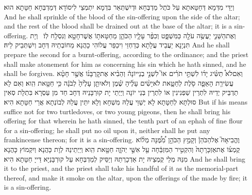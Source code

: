 {וְיַדֵּי מִדְּמָא דְּחַטָּאתָא עַל כֹּתֶל מַדְבְּחָא וּדְיִשְׁתְּאַר בִּדְמָא יִתְמְצֵי לִיסוֹדָא דְּמַדְבְּחָא חַטָּתָא הוּא׃}
{And he shall sprinkle of the blood of the sin-offering upon the side of the altar; and the rest of the blood shall be drained out at the base of the altar; it is a sin-offering.}{}
{וְאֶת\maqqaf הַשֵּׁנִ֛י יַעֲשֶׂ֥ה עֹלָ֖ה כַּמִּשְׁפָּ֑ט וְכִפֶּ֨ר עָלָ֧יו הַכֹּהֵ֛ן מֵחַטָּאת֥וֹ אֲשֶׁר\maqqaf חָטָ֖א וְנִסְלַ֥ח לֽוֹ׃ \setuma }
{וְיָת תִּנְיָנָא יַעֲבֵיד עֲלָתָא כְּדַחְזֵי וִיכַפַּר עֲלוֹהִי כָהֲנָא מֵחוֹבְתֵיהּ דְּחָב וְיִשְׁתְּבֵיק לֵיהּ׃}
{And he shall prepare the second for a burnt-offering, according to the ordinance; and the priest shall make atonement for him as concerning his sin which he hath sinned, and he shall be forgiven.}{}
{וְאִם\maqqaf לֹא֩ תַשִּׂ֨יג יָד֜וֹ לִשְׁתֵּ֣י תֹרִ֗ים אוֹ֮ לִשְׁנֵ֣י בְנֵי\maqqaf יוֹנָה֒ וְהֵבִ֨יא אֶת\maqqaf קׇרְבָּנ֜וֹ אֲשֶׁ֣ר חָטָ֗א עֲשִׂירִ֧ת הָאֵפָ֛ה סֹ֖לֶת לְחַטָּ֑את לֹא\maqqaf יָשִׂ֨ים עָלֶ֜יהָ שֶׁ֗מֶן וְלֹא\maqqaf יִתֵּ֤ן עָלֶ֙יהָ֙ לְבֹנָ֔ה כִּ֥י חַטָּ֖את הִֽוא׃}
{וְאִם לָא תַדְבֵּיק יְדֵיהּ לִתְרֵין שַׁפְנִינִין אוֹ לִתְרֵין בְּנֵי יוֹנָה וְיַיְתֵי יָת קוּרְבָּנֵיהּ דְּחָב חַד מִן עַסְרָא בִּתְלָת סְאִין סוּלְתָּא לְחַטָּתָא לָא יְשַׁוֵּי עֲלַהּ מִשְׁחָא וְלָא יִתֵּין עֲלַהּ לְבוֹנְתָא אֲרֵי חַטָּתָא הִיא׃}
{But if his means suffice not for two turtledoves, or two young pigeons, then he shall bring his offering for that wherein he hath sinned, the tenth part of an ephah of fine flour for a sin-offering; he shall put no oil upon it, neither shall he put any frankincense thereon; for it is a sin-offering.}{}
{וֶהֱבִיאָהּ֮ אֶל\maqqaf הַכֹּהֵן֒ וְקָמַ֣ץ הַכֹּהֵ֣ן \pasek  מִ֠מֶּ֠נָּה מְל֨וֹא קֻמְצ֜וֹ אֶת\maqqaf אַזְכָּרָתָהּ֙ וְהִקְטִ֣יר הַמִּזְבֵּ֔חָה עַ֖ל אִשֵּׁ֣י יְהֹוָ֑ה חַטָּ֖את הִֽוא׃}
{וְיַיְתֵינַהּ לְוָת כָּהֲנָא וְיִקְמוֹץ כָּהֲנָא מִנַּהּ מְלֵי קֻמְצֵיהּ יָת אַדְכָרְתַהּ וְיַסֵּיק לְמַדְבְּחָא עַל קוּרְבָּנַיָּא דַּייָ חַטָּתָא הִיא׃}
{And he shall bring it to the priest, and the priest shall take his handful of it as the memorial-part thereof, and make it smoke on the altar, upon the offerings of the \lord\space made by fire; it is a sin-offering.}{}
